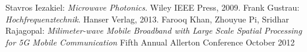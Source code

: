 %
%
\begin{thebibliography}{Lam00}
    Stavros Iezakiel: {\it Microwave Photonics}.
   Wiley IEEE Press, 2009. 
    Frank Gustrau: {\it Hochfrequenztechnik}.
   Hanser Verlag, 2013. 
    Farooq Khan, Zhouyue Pi, Sridhar Rajagopal: {\it Milimeter-wave Mobile Broadband with Large Scale Spatial Processing for 5G Mobile Communication} Fifth Annual Allerton Conference October 2012
\end{thebibliography}

